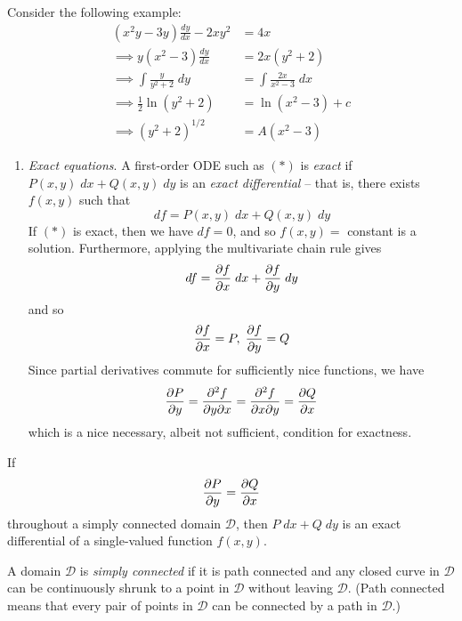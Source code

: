 \documentclass{../template/note}
\begin{document}
    \begin{example}
        Consider the following example:
        \begin{align*}
            (x^2y-3y)\frac{dy}{dx} - 2xy^2 &= 4x \\
            \implies y(x^2-3)\frac{dy}{dx} &= 2x(y^2+2) \\
            \implies \int \frac{y}{y^2+2} \; dy &= \int \frac{2x}{x^2-3} \; dx \\
            \implies \frac{1}{2} \ln(y^2+2) &= \ln(x^2-3) + c \\
            \implies \left(y^2+2\right)^{1/2} &= A(x^2-3)
        \end{align*}
    \end{example}
    
    \begin{enumerate}[resume]
        \item \emph{Exact equations}. A first-order ODE such as \((*)\) is \emph{exact} if \(P(x,y) \; dx + Q(x, y) \; dy\) is an \emph{exact differential} -- that is, there exists \(f(x, y)\) such that 
        \[
            df = P(x, y) \; dx + Q(x, y) \; dy
        \]
        If \((*)\) is exact, then we have \(df = 0\), and so \(f(x, y) =\) constant is a solution. Furthermore, applying the multivariate chain rule gives
        \[
            df = \pd{f}{x} \; dx + \pd{f}{y} \; dy
        \]
        and so
        \begin{align*}
            \pd{f}{x} = P,\; \pd{f}{y} = Q
        \end{align*}
        Since partial derivatives commute for sufficiently nice functions, we have
        \begin{align*}
            \pd{P}{y} = \pd{^2f}{y \partial x} = \pd{^2f}{x \partial y} = \pd{Q}{x}
        \end{align*}
        which is a nice necessary, albeit not sufficient, condition for exactness.
    \end{enumerate}
    
    \begin{theorem}
        If
        \begin{align*}
            \pd{P}{y} = \pd{Q}{x}
        \end{align*}
        throughout a simply connected domain \(\mathcal D\), then \(P \; dx + Q \; dy\) is an exact differential of a single-valued function \(f(x, y)\).
    \end{theorem}
    
    \begin{definition}
        A domain \(\mathcal D\) is \emph{simply connected} if it is path connected and any closed curve in \(\mathcal D\) can be continuously shrunk to a point in \(\mathcal D\) without leaving \(\mathcal D\). (Path connected means that every pair of points in \(\mathcal D\) can be connected by a path in \(\mathcal D\).)
    \end{definition}
    
\end{document}
